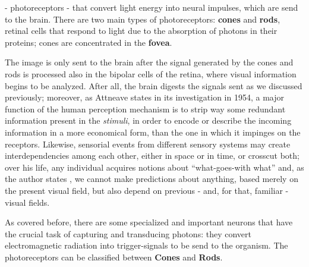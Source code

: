 - photoreceptors - that convert light energy into neural impulses,
which are send to the brain. There are two main types of photoreceptors: \textbf{cones} and
\textbf{rods},
retinal cells that respond to light due to the absorption of photons in their proteins; cones are concentrated in the \textbf{fovea}. \par
%
The image is only sent to the brain after the signal generated by the cones and rods is processed also
in the bipolar cells of the retina, where visual information begins to be analyzed. After all, the brain digests the signals sent as we discussed
previously; moreover, as Attneave \cite{Attneave1954} states in its investigation in 1954, a major function of
the human perception mechanism is to strip way some redundant information present in the \emph{stimuli},
in order to encode or describe the incoming information in a more economical form, than the one in which
it impinges on the receptors. Likewise, sensorial events from different sensory systems may create
interdependencies among each other, either in space or in time, or crosscut both; over his life, any
individual acquires notions about “what-goes-with what” and, as the author states \cite{Attneave1954}, we cannot make
predictions about anything, based merely on the present visual field, but also depend on previous - and,
for that, familiar - visual fields. \par
As covered before, there are some specialized and important neurons
that have the crucial task of capturing and transducing photons: they convert electromagnetic radiation
into trigger-signals to be send to the organism.
The photoreceptors can be classified between \textbf{Cones} and \textbf{Rods}.
%

